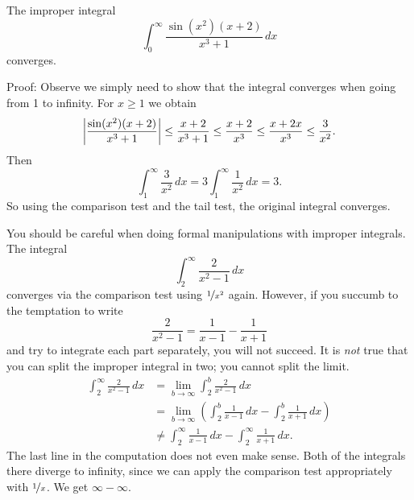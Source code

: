 \begin{example}
The improper integral
\begin{equation*}
\int_0^\infty \frac{\sin(x^2)(x+2)}{x^3+1} \,dx
\end{equation*}
converges.

Proof:  Observe we simply need to show
that the integral converges when going from 1 to infinity.
For $x \geq 1$ we obtain
\begin{equation*}
\left\lvert {\frac{\sin(x^2)(x+2)}{x^3+1}} \right\rvert
\leq
\frac{x+2}{x^3+1}
\leq \frac{x+2}{x^3} \leq
\frac{x+2x}{x^3} \leq \frac{3}{x^2} .
\end{equation*}
Then
\begin{equation*}
\int_1^\infty \frac{3}{x^2}\,dx
=
3 \int_1^\infty \frac{1}{x^2}\,dx
=
3 .
\end{equation*}
So using the comparison test and the tail test, the original
integral converges.
\end{example}

\begin{example}
You should be careful when doing formal manipulations with improper
integrals.
The integral
\begin{equation*}
\int_2^\infty \frac{2}{x^2-1}\,dx
\end{equation*}
converges via the comparison test using $\nicefrac{1}{x^2}$ again.  However, if you
succumb to the temptation to write
\begin{equation*}
\frac{2}{x^2-1} = 
\frac{1}{x-1}
-
\frac{1}{x+1} 
\end{equation*}
and try to integrate each part separately, you will not succeed.
It is \emph{not} true that you can split the improper
integral in two; you cannot split the limit.
\begin{equation*}
\begin{split}
\int_2^\infty \frac{2}{x^2-1} \,dx &=
\lim_{b\to \infty} \int_2^b \frac{2}{x^2-1} \,dx
\\
&=
\lim_{b\to \infty}
\left(
\int_2^b \frac{1}{x-1}\,dx
-
\int_2^b \frac{1}{x+1}\,dx
\right)
\\
&\not=
\int_2^\infty \frac{1}{x-1}\,dx
-
\int_2^\infty \frac{1}{x+1}\,dx .
\end{split}
\end{equation*}
The last line in the computation does not even make sense.  Both of the
integrals there diverge to infinity, since we can
apply the comparison test appropriately with
$\nicefrac{1}{x}$.  We get $\infty - \infty$.
\end{example}

